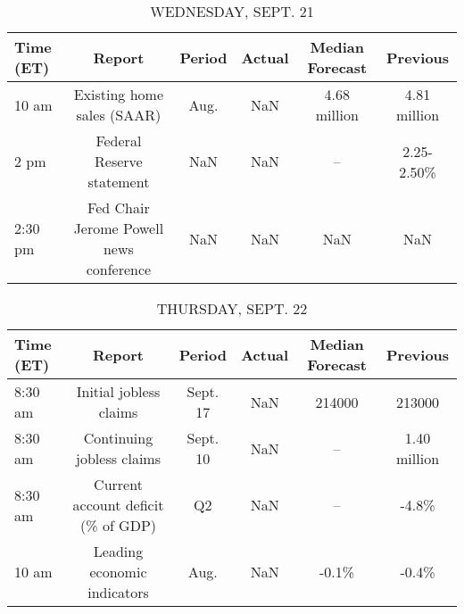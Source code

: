 \documentclass{book}
\begin{document}
  
  
  \begin{table}[htbp]%
  \caption{WEDNESDAY, SEPT. 21}%
  \centering%
  \begin{adjustbox}{width=1\textwidth}%
  \begin{tabular}{lccccc}
  \toprule
  Time (ET) &                                  Report & Period & Actual & Median Forecast &     Previous \\
  \midrule
      10 am &              Existing home sales (SAAR) &   Aug. &    NaN &    4.68 million & 4.81 million \\
       2 pm &               Federal Reserve statement &    NaN &    NaN &              -- &   2.25-2.50\% \\
    2:30 pm & Fed Chair Jerome Powell news conference &    NaN &    NaN &             NaN &          NaN \\
  \bottomrule
  \end{tabular}
  \end{adjustbox}%
  \end{table}
  
  
  
  \begin{table}[htbp]%
  \caption{THURSDAY, SEPT. 22}%
  \centering%
  \begin{adjustbox}{width=1\textwidth}%
  \begin{tabular}{lccccc}
  \toprule
  Time (ET) &                             Report &   Period & Actual & Median Forecast &     Previous \\
  \midrule
    8:30 am &             Initial jobless claims & Sept. 17 &    NaN &          214000 &       213000 \\
    8:30 am &          Continuing jobless claims & Sept. 10 &    NaN &              -- & 1.40 million \\
    8:30 am & Current account deficit (\% of GDP) &       Q2 &    NaN &              -- &        -4.8\% \\
      10 am &        Leading economic indicators &     Aug. &    NaN &           -0.1\% &        -0.4\% \\
  \bottomrule
  \end{tabular}
  \end{adjustbox}%
  \end{table}
  
  
\end{document}
